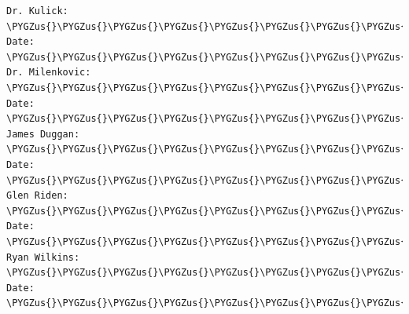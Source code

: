 \documentclass[letterpaper,10pt,english]{sphinxmanual}
\def\PYGZus{\char`\_}
\begin{document}
\begin{Verbatim}[commandchars=\\\{\}]
Dr. Kulick:       \PYGZus{}\PYGZus{}\PYGZus{}\PYGZus{}\PYGZus{}\PYGZus{}\PYGZus{}\PYGZus{}\PYGZus{}\PYGZus{}\PYGZus{}\PYGZus{}\PYGZus{}\PYGZus{}\PYGZus{}\PYGZus{}\PYGZus{}\PYGZus{}\PYGZus{}\PYGZus{}\PYGZus{}\PYGZus{}\PYGZus{}\PYGZus{}\PYGZus{}\PYGZus{}\PYGZus{}\PYGZus{}\PYGZus{}\PYGZus{}\PYGZus{}\PYGZus{}\PYGZus{}\PYGZus{}\PYGZus{}\PYGZus{}\PYGZus{}\PYGZus{}\PYGZus{}\PYGZus{}\PYGZus{} Date: \PYGZus{}\PYGZus{}\PYGZus{}\PYGZus{}\PYGZus{}\PYGZus{}\PYGZus{}\PYGZus{}\PYGZus{}\PYGZus{}\PYGZus{}\PYGZus{}
Dr. Milenkovic:   \PYGZus{}\PYGZus{}\PYGZus{}\PYGZus{}\PYGZus{}\PYGZus{}\PYGZus{}\PYGZus{}\PYGZus{}\PYGZus{}\PYGZus{}\PYGZus{}\PYGZus{}\PYGZus{}\PYGZus{}\PYGZus{}\PYGZus{}\PYGZus{}\PYGZus{}\PYGZus{}\PYGZus{}\PYGZus{}\PYGZus{}\PYGZus{}\PYGZus{}\PYGZus{}\PYGZus{}\PYGZus{}\PYGZus{}\PYGZus{}\PYGZus{}\PYGZus{}\PYGZus{}\PYGZus{}\PYGZus{}\PYGZus{}\PYGZus{}\PYGZus{}\PYGZus{}\PYGZus{}\PYGZus{} Date: \PYGZus{}\PYGZus{}\PYGZus{}\PYGZus{}\PYGZus{}\PYGZus{}\PYGZus{}\PYGZus{}\PYGZus{}\PYGZus{}\PYGZus{}\PYGZus{}
James Duggan:     \PYGZus{}\PYGZus{}\PYGZus{}\PYGZus{}\PYGZus{}\PYGZus{}\PYGZus{}\PYGZus{}\PYGZus{}\PYGZus{}\PYGZus{}\PYGZus{}\PYGZus{}\PYGZus{}\PYGZus{}\PYGZus{}\PYGZus{}\PYGZus{}\PYGZus{}\PYGZus{}\PYGZus{}\PYGZus{}\PYGZus{}\PYGZus{}\PYGZus{}\PYGZus{}\PYGZus{}\PYGZus{}\PYGZus{}\PYGZus{}\PYGZus{}\PYGZus{}\PYGZus{}\PYGZus{}\PYGZus{}\PYGZus{}\PYGZus{}\PYGZus{}\PYGZus{}\PYGZus{}\PYGZus{} Date: \PYGZus{}\PYGZus{}\PYGZus{}\PYGZus{}\PYGZus{}\PYGZus{}\PYGZus{}\PYGZus{}\PYGZus{}\PYGZus{}\PYGZus{}\PYGZus{}
Glen Riden:       \PYGZus{}\PYGZus{}\PYGZus{}\PYGZus{}\PYGZus{}\PYGZus{}\PYGZus{}\PYGZus{}\PYGZus{}\PYGZus{}\PYGZus{}\PYGZus{}\PYGZus{}\PYGZus{}\PYGZus{}\PYGZus{}\PYGZus{}\PYGZus{}\PYGZus{}\PYGZus{}\PYGZus{}\PYGZus{}\PYGZus{}\PYGZus{}\PYGZus{}\PYGZus{}\PYGZus{}\PYGZus{}\PYGZus{}\PYGZus{}\PYGZus{}\PYGZus{}\PYGZus{}\PYGZus{}\PYGZus{}\PYGZus{}\PYGZus{}\PYGZus{}\PYGZus{}\PYGZus{}\PYGZus{} Date: \PYGZus{}\PYGZus{}\PYGZus{}\PYGZus{}\PYGZus{}\PYGZus{}\PYGZus{}\PYGZus{}\PYGZus{}\PYGZus{}\PYGZus{}\PYGZus{}
Ryan Wilkins:     \PYGZus{}\PYGZus{}\PYGZus{}\PYGZus{}\PYGZus{}\PYGZus{}\PYGZus{}\PYGZus{}\PYGZus{}\PYGZus{}\PYGZus{}\PYGZus{}\PYGZus{}\PYGZus{}\PYGZus{}\PYGZus{}\PYGZus{}\PYGZus{}\PYGZus{}\PYGZus{}\PYGZus{}\PYGZus{}\PYGZus{}\PYGZus{}\PYGZus{}\PYGZus{}\PYGZus{}\PYGZus{}\PYGZus{}\PYGZus{}\PYGZus{}\PYGZus{}\PYGZus{}\PYGZus{}\PYGZus{}\PYGZus{}\PYGZus{}\PYGZus{}\PYGZus{}\PYGZus{}\PYGZus{} Date: \PYGZus{}\PYGZus{}\PYGZus{}\PYGZus{}\PYGZus{}\PYGZus{}\PYGZus{}\PYGZus{}\PYGZus{}\PYGZus{}\PYGZus{}\PYGZus{}
\end{Verbatim}
\end{document}
